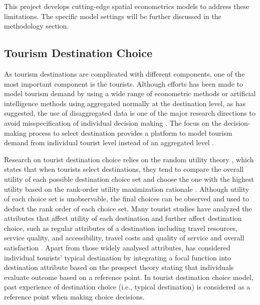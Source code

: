 \documentclass[11pt,a4paper]{amsart}
\theoremstyle{plain}
\theoremstyle{definition}
\begin{document}
\noindent This project develops cutting-edge spatial econometrics models to address these limitations. The specific model settings will be further discussed in the methodology section. 

\subsection{Tourism Destination Choice}\hfill\par
\noindent As tourism destinations are complicated with different components, one of the most important component is the tourists. Although efforts has been made to model tourism demand by using a wide range of econometric methods or artificial intelligence methods using aggregated normally at the destination level, as \textcite{songReviewResearchTourism2019} has suggested, the use of disaggregated data is one of the major research directions to avoid misspecification of individual decision making \parencite{masieroUnderstandingHotelLocation2019}. The focus on the decision-making process to select destination provides a platform to model tourism demand from individual tourist level instead of an aggregated level \parencite{baltasEconometricModelsDiscrete2007}. 

\noindent Research on tourist destination choice relies on the random utility theory \parencite{huybersDomesticTourismDestination2003}, which states that when tourists select destinations, they tend to compare the overall utility of each possible destination choice set and choose the one with the highest utility based on the rank-order utility maximization rationale \parencite{yangMODELINGSEQUENTIALTOURIST2013}. Although utility of each choice set is unobservable, the final choices can be observed and used to deduct the rank order of each choice set. Many tourist studies have analyzed the attributes that affect utility of each destination and further affect destination choice, such as regular attributes of a destination including travel resources, service quality, and accessibility, travel costs and quality of service and overall satisfaction \parencite{masieroModelingReferenceExperience2018}. Apart from those widely analysed attributes, \textcite{masieroModelingReferenceExperience2018} has considered individual tourists’ typical destination by integrating a focal function into destination attribute based on the prospect theory \parencite{kahnemanProspectTheoryAnalysis1979, tverskyAdvancesProspectTheory1992} stating that individuals evaluate outcome based on a reference point. In tourist destination choice model, past experience of destination choice (i.e., typical destination) is considered as a reference point when making choice decisions. 
\end{document}
